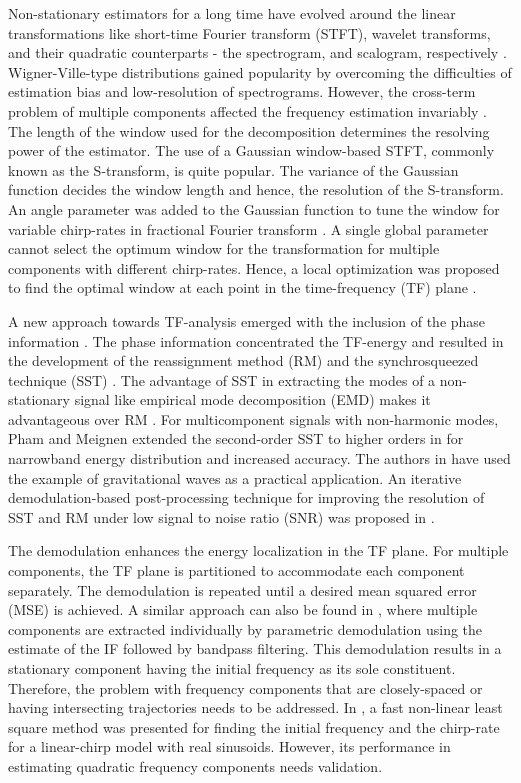 Non-stationary estimators for a long time have evolved around the linear transformations like short-time Fourier transform (STFT), wavelet transforms, and their quadratic counterparts - the spectrogram, and scalogram, respectively \cite{auger2013time}. Wigner-Ville-type distributions gained popularity by overcoming the difficulties of estimation bias and low-resolution of spectrograms. However, the cross-term problem of multiple components affected the frequency estimation invariably \cite{popovic2019efficient}. The length of the window used for the decomposition determines the resolving power of the estimator. The use of a Gaussian window-based STFT, commonly known as the S-transform, is quite popular. The variance of the Gaussian function decides the window length and hence, the resolution of the S-transform. An angle parameter was added to the Gaussian function to tune the window for variable chirp-rates in fractional Fourier transform \cite{tao2010short}. A single global parameter cannot select the optimum window for the transformation for multiple components with different chirp-rates. Hence, a local optimization was proposed to find the optimal window at each point in the time-frequency (TF) plane \cite{khan2013instantaneous}.

A new approach towards TF-analysis emerged with the inclusion of the phase information \cite{auger2013time}. The phase information concentrated the TF-energy and resulted in the development of the reassignment method (RM) \cite{auger1995improving} and the synchrosqueezed technique (SST) \cite{thakur2013synchrosqueezing}. The advantage of SST in extracting the modes of a non-stationary signal like empirical mode decomposition (EMD) makes it advantageous over RM \cite{daubechies2011synchrosqueezed}. For multicomponent signals with non-harmonic modes, Pham and Meignen extended the second-order SST \cite{oberlin2015second} to higher orders in \cite{pham2017high} for narrowband energy distribution and increased accuracy. The authors in \cite{pham2017high} have used the example of gravitational waves as a practical application. An iterative demodulation-based post-processing technique for improving the resolution of SST and RM under low signal to noise ratio (SNR) was proposed in \cite{wang2014matching}. 

The demodulation enhances the energy localization in the TF plane. For multiple components, the TF plane is partitioned to accommodate each component separately. The demodulation is repeated until a desired mean squared error (MSE) is achieved. A similar approach can also be found in \cite{yang2015component}, where multiple components are extracted individually by parametric demodulation using the estimate of the IF followed by bandpass filtering. This demodulation results in a stationary component having the initial frequency as its sole constituent. Therefore, the problem with frequency components that are closely-spaced or having intersecting trajectories needs to be addressed. In \cite{jensen2017fast}, a fast non-linear least square method was presented for finding the initial frequency and the chirp-rate for a linear-chirp model with real sinusoids. However, its performance in estimating quadratic frequency components needs validation. 

